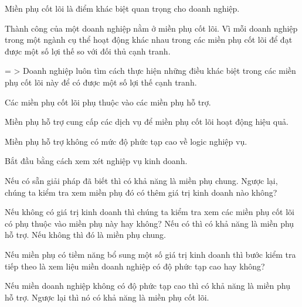

Miền phụ cốt lõi là điểm khác biệt quan trọng cho doanh nghiệp.

Thành công của một doanh nghiệp nằm ở miền phụ cốt lõi. Vì mỗi doanh nghiệp trong một ngành cụ thể hoạt động khác nhau trong các miền phụ cốt lõi để đạt được một số lợi thế so với đối thủ cạnh tranh.

= > Doanh nghiệp luôn tìm cách thực hiện những điều khác biệt trong các miền phụ cốt lõi này để có được một số lợi thế cạnh tranh.



Các miền phụ cốt lõi phụ thuộc vào các miền phụ hỗ trợ.

Miền phụ hỗ trợ cung cấp các dịch vụ để miền phụ cốt lõi hoạt động hiệu quả.

Miền phụ hỗ trợ không có mức độ phức tạp cao về logic nghiệp vụ.






Bắt đầu bằng cách xem xét nghiệp vụ kinh doanh.

Nếu có sẵn giải pháp đã biết thì có khả năng là miền phụ chung. Ngược lại, chúng ta kiểm tra xem miền phụ đó có thêm giá trị kinh doanh nào không?

Nếu không có giá trị kinh doanh thì chúng ta kiểm tra xem các miền phụ cốt lõi có phụ thuộc vào miền phụ này hay không? Nếu có thì có khả năng là miền phụ hỗ trợ. Nếu không thì đó là miền phụ chung.

Nếu miền phụ có tiềm năng bổ sung một số giá trị kinh doanh thì bước kiểm tra tiếp theo là xem liệu miền doanh nghiệp có độ phức tạp cao hay không?

Nếu miền doanh nghiệp không có độ phức tạp cao thì có khả năng là miền phụ hỗ trợ. Ngược lại thì nó có khả năng là miền phụ cốt lõi.


